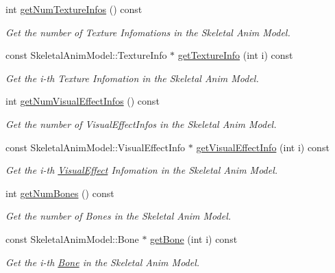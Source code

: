 \begin{DoxyCompactItemize}
\item 
int \hyperlink{class_magnum_1_1endif_af7894c43a6807d42c1ddd026a61fb9cd}{get\+Num\+Texture\+Infos} () const 
\begin{DoxyCompactList}\small\item\em Get the number of Texture Infomations in the Skeletal Anim Model. \end{DoxyCompactList}\item 
const Skeletal\+Anim\+Model\+::\+Texture\+Info $\ast$ \hyperlink{class_magnum_1_1endif_a2b584f886902531fe8f95b6af822cff7}{get\+Texture\+Info} (int i) const 
\begin{DoxyCompactList}\small\item\em Get the i-\/th Texture Infomation in the Skeletal Anim Model. \end{DoxyCompactList}\item 
int \hyperlink{class_magnum_1_1endif_ae7a3e48aeefba53e20dad31b3ae497d2}{get\+Num\+Visual\+Effect\+Infos} () const 
\begin{DoxyCompactList}\small\item\em Get the number of Visual\+Effect\+Infos in the Skeletal Anim Model. \end{DoxyCompactList}\item 
const Skeletal\+Anim\+Model\+::\+Visual\+Effect\+Info $\ast$ \hyperlink{class_magnum_1_1endif_ac2b9142e4f0b550fe780cf765acdfc10}{get\+Visual\+Effect\+Info} (int i) const 
\begin{DoxyCompactList}\small\item\em Get the i-\/th \hyperlink{class_magnum_1_1_visual_effect}{Visual\+Effect} Infomation in the Skeletal Anim Model. \end{DoxyCompactList}\item 
int \hyperlink{class_magnum_1_1endif_a7d911b8de0406185c589a97e70bd832e}{get\+Num\+Bones} () const 
\begin{DoxyCompactList}\small\item\em Get the number of Bones in the Skeletal Anim Model. \end{DoxyCompactList}\item 
const Skeletal\+Anim\+Model\+::\+Bone $\ast$ \hyperlink{class_magnum_1_1endif_a0afbc81f8b22efa12df6f8c66fa00fc4}{get\+Bone} (int i) const 
\begin{DoxyCompactList}\small\item\em Get the i-\/th \hyperlink{class_magnum_1_1endif_1_1_bone}{Bone} in the Skeletal Anim Model. \end{DoxyCompactList}\item 

\end{DoxyCompactItemize}
